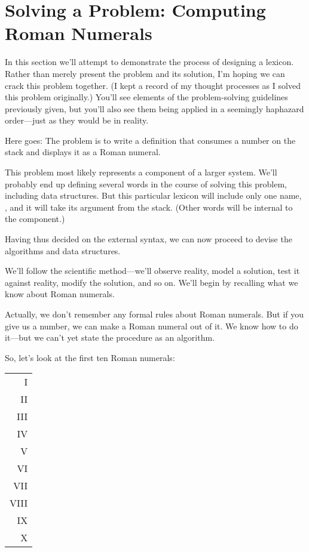 \section{Solving a Problem: Computing Roman Numerals}%
%
%

In this section we'll attempt to demonstrate the process of designing a
lexicon. Rather than merely present the problem and its solution, I'm
hoping we can crack this problem together. (I kept a record of my
thought processes as I solved this problem originally.) You'll see
elements of the problem-solving guidelines previously given, but you'll
also see them being applied in a seemingly haphazard order---just as they
would be in reality.

Here goes: The problem is to write a definition that consumes a
number on the stack and displays it as a Roman numeral.

This problem most likely represents a component of a larger system. We'll
probably end up defining several words in the course of solving this
problem, including data structures. But this particular lexicon will
include only one name, , and it will take its argument from
the stack. (Other words will be internal to the component.)

Having thus decided on the external syntax, we can now proceed to
devise the algorithms and data structures.

We'll follow the scientific method---we'll observe reality, model a
solution, test it against reality, modify the solution, and so on. We'll
begin by recalling what we know about Roman numerals.

Actually, we don't remember any formal rules about Roman
numerals. But if you give us a number, we can make a Roman numeral
out of it. We know how to do it---but we can't yet state the procedure as
an algorithm.

So, let's look at the first ten Roman numerals:

\medskip
{\sf\begin{tabular}{r}
I \\
II \\
III \\
IV \\
V \\
VI \\
VII \\
VIII \\
IX \\
X \\
\end{tabular}}
\medskip


